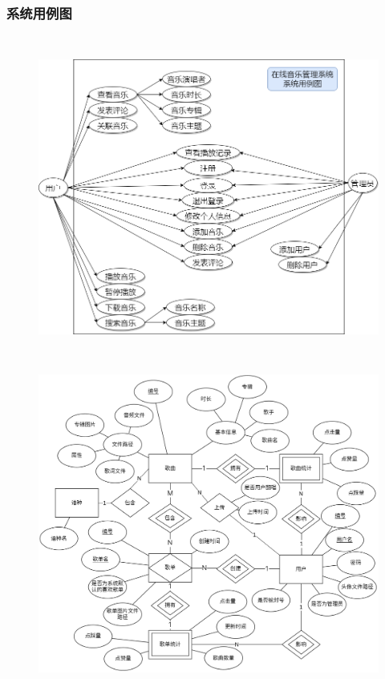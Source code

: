 \documentclass[UTF8,14pt]{article}
\numberwithin{figure}{subsubsection}
\numberwithin{table}{subsubsection}
\begin{document}
\subsubsection{系统用例图}
\begin{center}
	\begin{figure}[H]
		\centering
		\includegraphics[width=13.181cm,height=10.655cm]{figures/1.png}
	\end{figure}
\end{center}
\begin{center}
	\begin{figure}[H]
		\centering
		\includegraphics[width=11.28cm,height=9.91cm]{figures/ER3.png}
	\end{figure}
\end{center}
\end{document}

